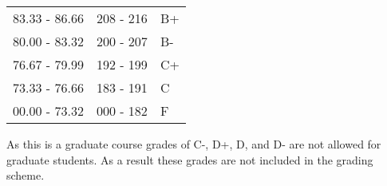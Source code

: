\documentclass[
]{article}
\begin{document}
\begin{longtable}[]{@{}lll@{}}
\begin{minipage}[t]{0.20\columnwidth}
83.33 - 86.66\strut
\end{minipage} & \begin{minipage}[t]{0.14\columnwidth}\raggedright
208 - 216\strut
\end{minipage} & \begin{minipage}[t]{0.16\columnwidth}\raggedright
B+\strut
\end{minipage}\tabularnewline
\begin{minipage}[t]{0.20\columnwidth}\raggedright
80.00 - 83.32\strut
\end{minipage} & \begin{minipage}[t]{0.14\columnwidth}\raggedright
200 - 207\strut
\end{minipage} & \begin{minipage}[t]{0.16\columnwidth}\raggedright
B-\strut
\end{minipage}\tabularnewline
\begin{minipage}[t]{0.20\columnwidth}\raggedright
76.67 - 79.99\strut
\end{minipage} & \begin{minipage}[t]{0.14\columnwidth}\raggedright
192 - 199\strut
\end{minipage} & \begin{minipage}[t]{0.16\columnwidth}\raggedright
C+\strut
\end{minipage}\tabularnewline
\begin{minipage}[t]{0.20\columnwidth}\raggedright
73.33 - 76.66\strut
\end{minipage} & \begin{minipage}[t]{0.14\columnwidth}\raggedright
183 - 191\strut
\end{minipage} & \begin{minipage}[t]{0.16\columnwidth}\raggedright
C\strut
\end{minipage}\tabularnewline
\begin{minipage}[t]{0.20\columnwidth}\raggedright
00.00 - 73.32\strut
\end{minipage} & \begin{minipage}[t]{0.14\columnwidth}\raggedright
000 - 182\strut
\end{minipage} & \begin{minipage}[t]{0.16\columnwidth}\raggedright
F\strut
\end{minipage}\tabularnewline
\bottomrule
\end{longtable}

As this is a graduate course grades of C-, D+, D, and D- are not allowed
for graduate students. As a result these grades are not included in the
grading scheme.
\end{document}
